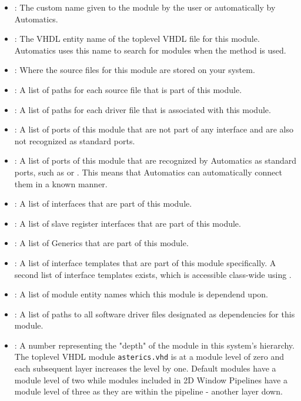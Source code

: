 \begin{itemize}
\item {}: The custom name given to the module by the user or automatically by Automatics.
\item {}: The VHDL entity name of the toplevel VHDL file for this module. Automatics uses this name to search for modules when the  method is used.
\item {}: Where the source files for this module are stored on your system.
\item {}: A list of paths for each source file that is part of this module.
\item {}: A list of paths for each driver file that is associated with this module.
\item {}: A list of ports of this module that are not part of any interface and are also not recognized as standard ports.
\item {}: A list of ports of this module that are recognized by Automatics as standard ports, such as  or . This means that Automatics can automatically connect them in a known manner.
\item {}: A list of interfaces that are part of this module.
\item {}: A list of slave register interfaces that are part of this module.
\item {}: A list of Generics that are part of this module.
\item {}: A list of interface templates that are part of this module specifically. A second list of interface templates exists, which is accessible class-wide using .
\item {}: A list of module entity names which this module is dependend upon.
\item {}: A list of paths to all software driver files designated as dependencies for this module.
\item {}: A number representing the "depth" of the module in this system's hierarchy. The toplevel VHDL module \texttt{asterics.vhd} is at a module level of zero and each subsequent layer increases the level by one. Default modules have a module level of two while modules included in 2D Window Pipelines have a module level of three as they are within the pipeline - another layer down.
\end{itemize}


